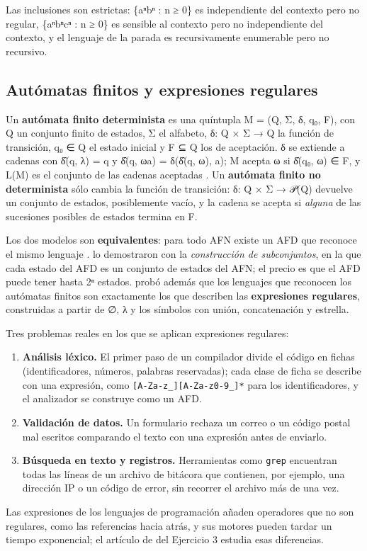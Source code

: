 Las inclusiones son estrictas: \{aⁿbⁿ : n ≥ 0\} es independiente del contexto pero no regular, \{aⁿbⁿcⁿ : n ≥ 0\} es sensible al contexto pero no independiente del contexto, y el lenguaje de la parada es recursivamente enumerable pero no recursivo.

\hypertarget{autuxf3matas-finitos-y-expresiones-regulares}{%
\subsection{Autómatas finitos y expresiones regulares}\label{autuxf3matas-finitos-y-expresiones-regulares}}

Un \textbf{autómata finito determinista} es una quíntupla M = (Q, Σ, δ, q₀, F), con Q un conjunto finito de estados, Σ el alfabeto, δ: Q × Σ → Q la función de transición, q₀ ∈ Q el estado inicial y F ⊆ Q los de aceptación. δ se extiende a cadenas con δ̂(q, λ) = q y δ̂(q, ωa) = δ(δ̂(q, ω), a); M acepta ω si δ̂(q₀, ω) ∈ F, y L(M) es el conjunto de las cadenas aceptadas \autocite[sec.~2.2]{hopcroft2007}. Un \textbf{autómata finito no determinista} sólo cambia la función de transición: δ: Q × Σ → 𝒫(Q) devuelve un conjunto de estados, posiblemente vacío, y la cadena se acepta si \emph{alguna} de las sucesiones posibles de estados termina en F.

Los dos modelos son \textbf{equivalentes}: para todo AFN existe un AFD que reconoce el mismo lenguaje \autocite{kozen1997}. \textcite{rabin1959} lo demostraron con la \emph{construcción de subconjuntos}, en la que cada estado del AFD es un conjunto de estados del AFN; el precio es que el AFD puede tener hasta 2ⁿ estados. \textcite{kleene1956} probó además que los lenguajes que reconocen los autómatas finitos son exactamente los que describen las \textbf{expresiones regulares}, construidas a partir de ∅, λ y los símbolos con unión, concatenación y estrella.

Tres problemas reales en los que se aplican expresiones regulares:

\begin{enumerate}
\def\labelenumi{\arabic{enumi}.}
\tightlist
\item
  \textbf{Análisis léxico.} El primer paso de un compilador divide el código en fichas (identificadores, números, palabras reservadas); cada clase de ficha se describe con una expresión, como \texttt{{[}A-Za-z\_{]}{[}A-Za-z0-9\_{]}*} para los identificadores, y el analizador se construye como un AFD.
\item
  \textbf{Validación de datos.} Un formulario rechaza un correo o un código postal mal escritos comparando el texto con una expresión antes de enviarlo.
\item
  \textbf{Búsqueda en texto y registros.} Herramientas como \texttt{grep} encuentran todas las líneas de un archivo de bitácora que contienen, por ejemplo, una dirección IP o un código de error, sin recorrer el archivo más de una vez.
\end{enumerate}

Las expresiones de los lenguajes de programación añaden operadores que no son regulares, como las referencias hacia atrás, y sus motores pueden tardar un tiempo exponencial; el artículo de \textcite{davis2019} del Ejercicio 3 estudia esas diferencias.
